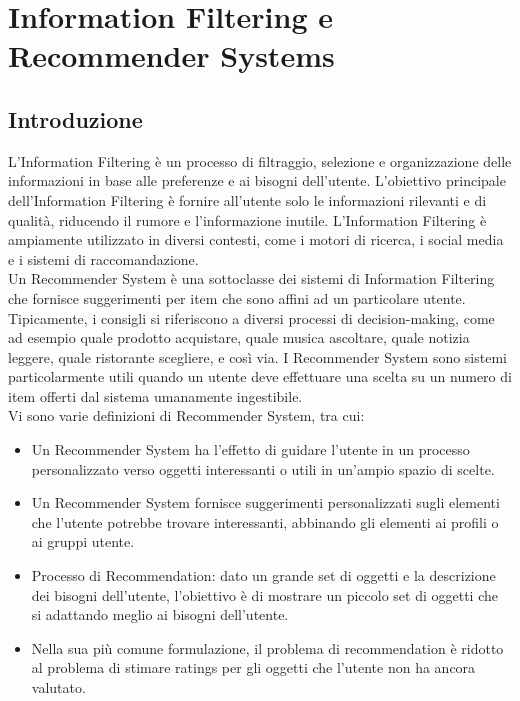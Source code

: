 \documentclass{report}
\begin{document}
	\chapter{Information Filtering e Recommender Systems}
	\section{Introduzione}
	L'Information Filtering è un processo di filtraggio, selezione e organizzazione delle informazioni in base alle preferenze e ai bisogni dell'utente. L'obiettivo principale dell'Information Filtering è fornire all'utente solo le informazioni rilevanti e di qualità, riducendo il rumore e l'informazione inutile. L'Information Filtering è ampiamente utilizzato in diversi contesti, come i motori di ricerca, i social media e i sistemi di raccomandazione. 
	\vspace{\baselineskip}\\
	Un Recommender System è una sottoclasse dei sistemi di Information Filtering che fornisce suggerimenti per item che sono affini ad un particolare utente. Tipicamente, i consigli si riferiscono a diversi processi di decision-making, come ad esempio quale prodotto acquistare, quale musica ascoltare, quale notizia leggere, quale ristorante scegliere, e così via. I Recommender System sono sistemi particolarmente utili quando un utente deve effettuare una scelta su un numero
	di item offerti dal sistema umanamente ingestibile.
	\vspace{\baselineskip}\\
	Vi sono varie definizioni di Recommender System, tra cui:
	\begin{itemize}
		\item Un Recommender System ha l'effetto di guidare l'utente in un processo personalizzato verso oggetti interessanti o utili in un'ampio spazio di scelte.
		\item Un Recommender System fornisce suggerimenti personalizzati sugli elementi che l'utente potrebbe trovare interessanti, abbinando gli elementi ai profili o ai gruppi utente.
		\item Processo di Recommendation: dato un grande set di oggetti e la descrizione dei bisogni dell'utente, l'obiettivo è di mostrare un piccolo set di oggetti che si adattando meglio ai bisogni dell'utente.
		\item Nella sua più comune formulazione, il problema di recommendation è ridotto al problema di stimare ratings per gli oggetti che l'utente non ha ancora valutato.
	\end{itemize}
\end{document}
